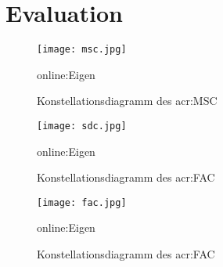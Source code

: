 
\chapter{Evaluation}
\label{sec:evaluation}

\begin{figure}[H]
	\centering
	\texttt{[image: msc.jpg]}
	\caption[Konstellationsdiagramm des \gls{acr:MSC}]{Konstellationsdiagramm des \gls{acr:MSC}}\gls{online:Eigen}
	\label{fig:msc}
\end{figure}

\begin{figure}[H]
	\centering
	\texttt{[image: sdc.jpg]}
	\caption[Konstellationsdiagramm des \gls{acr:SDC}]{Konstellationsdiagramm des \gls{acr:FAC}}\gls{online:Eigen}
	\label{fig:sdc}
\end{figure}

\begin{figure}[H]
	\centering
	\texttt{[image: fac.jpg]}
	\caption[Konstellationsdiagramm des \gls{acr:FAC}]{Konstellationsdiagramm des \gls{acr:FAC}}\gls{online:Eigen}
	\label{fig:fac}
\end{figure}